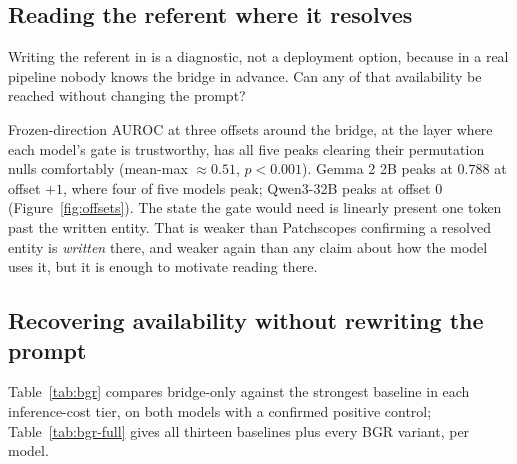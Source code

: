 \documentclass{article}
\begin{document}
\subsection{Reading the referent where it resolves}
\label{sec:res-latent}

Writing the referent in is a diagnostic, not a deployment option, because in a real pipeline nobody
knows the bridge in advance. Can any of that availability be reached without changing the prompt?

Frozen-direction AUROC at three offsets around the bridge, at the layer where each model's gate is
trustworthy, has all five peaks clearing their permutation nulls comfortably (mean-max $\approx0.51$,
$p<0.001$). Gemma 2 2B peaks at $0.788$ at offset $+1$, where four of five models peak; Qwen3-32B
peaks at offset $0$ (Figure~\ref{fig:offsets}). The state the gate would need is linearly
present one token past the written entity. That is weaker than Patchscopes confirming a resolved
entity is \emph{written} there, and weaker again than any claim about how the model uses it, but it is
enough to motivate reading there.

\subsection{Recovering availability without rewriting the prompt}

Table~\ref{tab:bgr} compares bridge-only against the strongest baseline in each inference-cost tier, on
both models with a confirmed positive control; Table~\ref{tab:bgr-full} gives all thirteen baselines
plus every BGR variant, per model.
\end{document}

